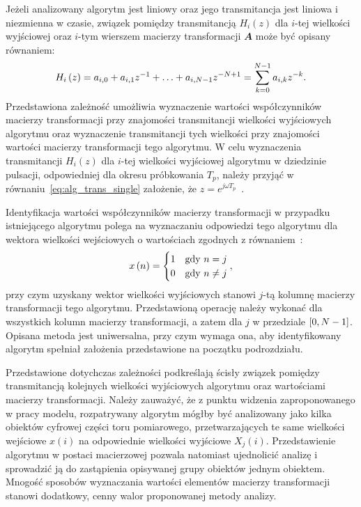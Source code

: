 Jeżeli analizowany algorytm jest liniowy oraz jego transmitancja jest liniowa i niezmienna w czasie, związek pomiędzy transmitancją $H_{i}(z)$ dla $i$-tej wielkości wyjściowej oraz $i$-tym wierszem macierzy transformacji $\mathbfit{A}$ może być opisany równaniem:
\begin{equation}
H_{i} \left(z\right) = a_{i, 0} + a_{i, 1} z^{-1} + \hdots + a_{i, N-1} z^{-N+1} = \sum _{k = 0} ^{N-1} a_{i, k} z^{-k} \label{eq:alg_trans_single}.
\end{equation}
Przedstawiona zależność umożliwia wyznaczenie wartości współczynników macierzy transformacji przy znajomości transmitancji wielkości wyjściowych algorytmu oraz wyznaczenie transmitancji tych wielkości przy znajomości wartości macierzy transformacji tego algorytmu. W celu wyznaczenia transmitancji $H_{i}(z)$ dla $i$-tej wielkości wyjściowej algorytmu w dziedzinie pulsacji, odpowiedniej dla okresu próbkowania $T_{p}$, należy przyjąć w równaniu~\eqref{eq:alg_trans_single} założenie, że $z = e^{j\omega T_{p}}$~\cite{proakis_dsp}.

Identyfikacja wartości współczynników macierzy transformacji w przypadku istniejącego algorytmu polega na wyznaczaniu odpowiedzi tego algorytmu dla wektora wielkości wejściowych o wartościach zgodnych z równaniem~\cite{jakubiec_algorithms, jakubiec_system}:
\begin{equation}
x \emb{n} =
\begin{cases}
	1 & $gdy$~n = j \\
	0 & $gdy$~n \neq j
\end{cases}
\label{eq:wt_ident},
\end{equation}
przy czym uzyskany wektor wielkości wyjściowych stanowi $j$-tą kolumnę macierzy transformacji tego algorytmu. Przedstawioną operację należy wykonać dla wszystkich kolumn macierzy transformacji, a zatem dla $j$ w przedziale $\interval{0}{N-1}$. Opisana metoda jest uniwersalna, przy czym wymaga ona, aby identyfikowany algorytm spełniał założenia przedstawione na początku podrozdziału.

Przedstawione dotychczas zależności podkreślają ścisły związek pomiędzy transmitancją kolejnych wielkości wyjściowych algorytmu oraz wartościami macierzy transformacji. Należy zauważyć, że z punktu widzenia zaproponowanego w pracy modelu, rozpatrywany algorytm mógłby być analizowany jako kilka obiektów cyfrowej części toru pomiarowego, przetwarzających te same wielkości wejściowe $x(i)$ na odpowiednie wielkości wyjściowe $X_{j}(i)$. Przedstawienie algorytmu w postaci macierzowej pozwala natomiast ujednolicić analizę i sprowadzić ją do zastąpienia opisywanej grupy obiektów jednym obiektem. Mnogość sposobów wyznaczania wartości elementów macierzy transformacji stanowi dodatkowy, cenny walor proponowanej metody analizy.

